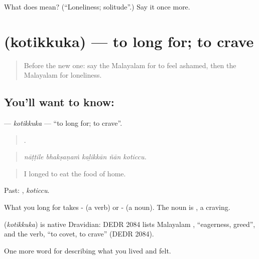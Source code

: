 \begin{tcolorbox}[breakable,colback=teal!4,colframe=teal!35!black,title={Before you move on}]
What does  mean? (\textquotedblleft{}Loneliness; solitude\textquotedblright{}.) Say it once more.
\end{tcolorbox}
\section[\texorpdfstring{\ml{കൊതിക്കുക} (kotikkuka)}{കൊതിക്കുക (kotikkuka)}]{ (kotikkuka) — to long for; to crave}

\label{lesson:ML-C518-kotikkuka}



\begin{quote}
Before the new one: say the Malayalam for to feel ashamed, then the Malayalam for loneliness.
\end{quote}

\subsection*{You'll want to know: }
\textbf{} — \emph{kotikkuka} — \textquotedblleft{}to long for; to crave\textquotedblright{}.

\begin{quote}
    .
\end{quote}

\begin{quote}
\emph{nāṭṭile bhakṣaṇaṁ kaḻikkān ñān koticcu.}
\end{quote}

\begin{quote}
I longed to eat the food of home.
\end{quote}

Past: , \emph{koticcu}.

What you long for takes - (a verb) or - (a noun). The noun is , a craving.

\begin{cousinweb}
\textbf{} (\emph{kotikkuka}) is native Dravidian: DEDR 2084 lists Malayalam , \textquotedblleft{}eagerness, greed\textquotedblright{}, and the verb, \textquotedblleft{}to covet, to crave\textquotedblright{} (DEDR 2084).
\end{cousinweb}

\begin{grammarlens}[title={What you've built}]
One more word for describing what you lived and felt.
\end{grammarlens}

